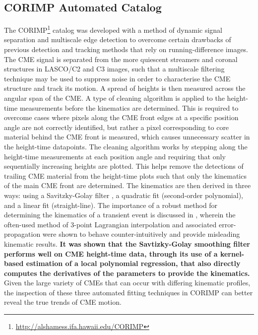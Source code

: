 \documentclass[referee,a4paper,12pt,traditabstract]{swsc}
\begin{document}
\begin{linenumbers}
\subsection{CORIMP Automated Catalog}
\label{sect_corimp}

The CORIMP\footnote{\href{http://alshamess.ifa.hawaii.edu/CORIMP/}{http://alshamess.ifa.hawaii.edu/CORIMP}} catalog was developed with a method of dynamic signal separation and multiscale edge detection to overcome certain drawbacks of previous detection and tracking methods that rely on running-difference images. The CME signal is separated from the more quiescent streamers and coronal structures in LASCO/C2 and C3 images, such that a multiscale filtering technique may be used to suppress noise in order to characterise the CME structure and track its motion. A spread of heights is then measured across the angular span of the CME. A type of cleaning algorithm is applied to the height-time measurements before the kinematics are determined. This is required to overcome cases where pixels along the CME front edges at a specific position angle are not correctly identified, but rather a pixel corresponding to core material behind the CME front is measured, which causes unnecessary scatter in the height-time datapoints. The cleaning algorithm works by stepping along the height-time measurements at each position angle and requiring that only sequentially increasing heights are plotted. This helps remove the detections of trailing CME material from the height-time plots such that only the kinematics of the main CME front are determined. The kinematics are then derived in three ways: using a Savitzky-Golay filter \citep{Savitzky-Golay1964}, a quadratic fit (second-order polynomial), and a linear fit (straight-line). The importance of a robust method for determining the kinematics of a transient event is discussed in \cite{2013A&A...557A..96B}, wherein the often-used method of 3-point Lagrangian interpolation and associated error-propagation were shown to behave counter-intuitively and provide misleading kinematic results. {\bf It was shown that the Savtizky-Golay smoothing filter performs well on CME height-time data, through its use of a kernel-based estimation of a local polynomial regression, that also directly computes the derivatives of the parameters to provide the kinematics.} Given the large variety of CMEs that can occur with differing kinematic profiles, the inspection of these three automated fitting techniques in CORIMP can better reveal the true trends of CME motion.



\end{linenumbers}
\end{document}
